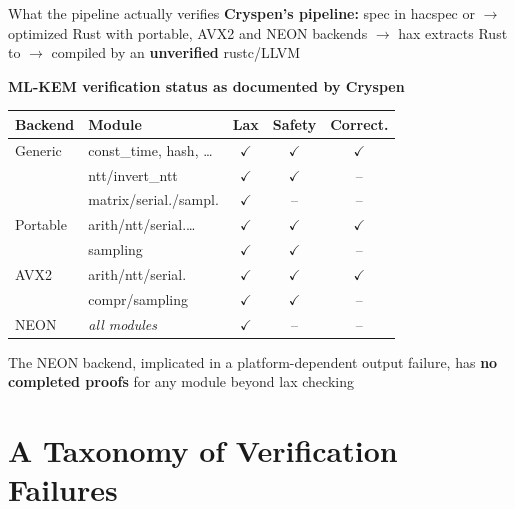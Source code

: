 \ifdefined\PRESENTATION\else\PassOptionsToClass{handout}{beamer}\fi\documentclass[aspectratio=169, lualatex]{beamer}
\begin{document}
\begin{frame}{What the pipeline actually verifies}
	\textbf{Cryspen's pipeline:} spec in hacspec or \fstar $\rightarrow$ optimized Rust with portable, AVX2 and NEON backends $\rightarrow$ hax extracts Rust to \fstar $\rightarrow$ compiled by an \textbf{unverified} rustc/LLVM
	\vspace{0.3em}
	\begin{center}
		\scriptsize
		\textbf{ML-KEM verification status as documented by Cryspen}
		\vspace{0.2em}

		\begin{tabular}{|l|l|c|c|c|}
			\hline
			\textbf{Backend} & \textbf{Module}           & \textbf{Lax} & \textbf{Safety} & \textbf{Correct.} \\
			\hline
			Generic          & const\_time, hash, \ldots & $\checkmark$ & $\checkmark$    & $\checkmark$      \\
			                 & ntt/invert\_ntt           & $\checkmark$ & $\checkmark$    & --                \\
			                 & matrix/serial./sampl.     & $\checkmark$ & --              & --                \\
			\hline
			Portable         & arith/ntt/serial.\ldots   & $\checkmark$ & $\checkmark$    & $\checkmark$      \\
			                 & sampling                  & $\checkmark$ & $\checkmark$    & --                \\
			\hline
			AVX2             & arith/ntt/serial.         & $\checkmark$ & $\checkmark$    & $\checkmark$      \\
			                 & compr/sampling            & $\checkmark$ & $\checkmark$    & --                \\
			\hline
			NEON             & \textit{all modules}      & $\checkmark$ & --              & --                \\
			\hline
		\end{tabular}
	\end{center}
	\vspace{0.2em}
	\begin{center}
		\small
		The NEON backend, implicated in a platform-dependent output failure, has \textbf{no completed proofs} for any module beyond lax checking
	\end{center}
\end{frame}

\section{A Taxonomy of Verification Failures}
\end{document}
